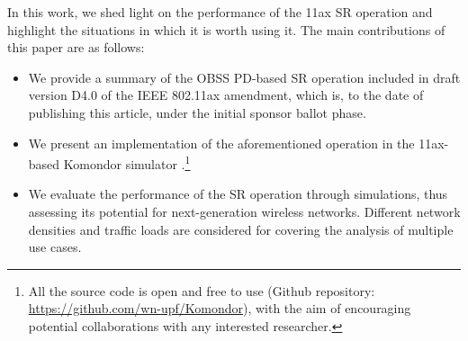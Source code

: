 \documentclass[conference]{IEEEtran}
\begin{document}
	\begin{table}[]
		\caption{Effect of increasing the OBSS/PD threshold and the transmission power.}
		\label{tbl:effects_sr}
	\end{table}
	
	In this work, we shed light on the performance of the 11ax SR operation and highlight the situations in which it is worth using it. The main contributions of this paper are as follows:
	\begin{itemize}
		\item We provide a summary of the OBSS PD-based SR operation included in draft version D4.0 of the IEEE 802.11ax amendment, which is, to the date of publishing this article, under the initial sponsor ballot phase.
		\item We present an implementation of the aforementioned operation in the 11ax-based Komondor simulator \cite{komondor}.\footnote{All the source code is open and free to use (Github repository: \url{https://github.com/wn-upf/Komondor}), with the aim of encouraging potential collaborations with any interested researcher.}
		\item We evaluate the performance of the SR operation through simulations, thus assessing its potential for next-generation wireless networks. Different network densities and traffic loads are considered for covering the analysis of multiple use cases.
	\end{itemize}
	
\end{document}
